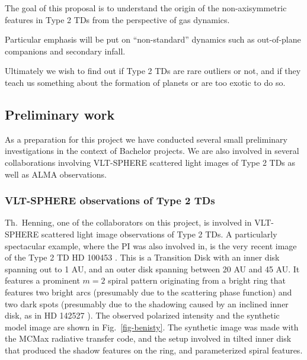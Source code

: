 \documentclass[10pt,fleqn,twoside,a4paper]{article}
\begin{document}
\begin{highlight}
The goal of this proposal is to understand the origin of the non-axisymmetric
features in Type 2 TDs from the perspective of gas dynamics.
\end{highlight}
Particular
emphasis will be put on ``non-standard'' dynamics such as out-of-plane
companions and secondary infall.
\begin{highlight}
Ultimately we wish
to find out if Type 2 TDs are rare outliers or not, and if they teach us
something about the formation of planets or are too exotic to do so.
\end{highlight}



\subsection{Preliminary work}
As a preparation for this project we have conducted several small
preliminary investigations in the context of Bachelor projects. We are also
involved in several collaborations involving VLT-SPHERE scattered light
images of Type 2 TDs as well as ALMA observations.

\subsubsection{VLT-SPHERE observations of Type 2 TDs}
Th.~Henning, one of the collaborators on this project, is involved in
VLT-SPHERE scattered light image observations of Type 2 TDs. A particularly
spectacular example, where the PI was also involved in, is the very recent
image of the Type 2 TD HD 100453 \citep{2016arXiv161010089B}. This is a
Transition Disk with an inner disk spanning out to 1 AU, and an outer disk
spanning between 20 AU and 45 AU. It features a prominent $m=2$ spiral
pattern originating from a bright ring that features two bright arcs
(presumably due to the scattering phase function) and two dark spots
(presumably due to the shadowing caused by an inclined inner disk, as in HD
142527 \citep{2015ApJ...798L..44M}). The observed polarized intensity
and the synthetic model image are shown in Fig.~\ref{fig-benisty}. The
synthetic image was made with the MCMax radiative transfer code, and
the setup involved in tilted inner disk that produced the shadow features
on the ring, and parameterized spiral features.
\end{document}
